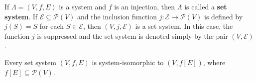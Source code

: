 If $\Lambda = (V, f, E)$ is a system and $f$ is an injection, then $\Lambda$ is called a \textbf{set system}. If $\mathcal{E} \subseteq \mathcal{P}(V)$ and the inclusion function $j: \mathcal{E} \to \mathcal{P}(V)$ is defined by $j(S) = S$ for each $S \in \mathcal{E}$, then $(V, j, \mathcal{E})$ is a set system. In this case, the function $j$ is suppressed and the set system is denoted simply by the pair $(V, \mathcal{E})$.

Every set system $(V, f, E)$ is system-isomorphic to $(V, f[E])$, where $f[E] \subseteq \mathcal{P}(V)$.
